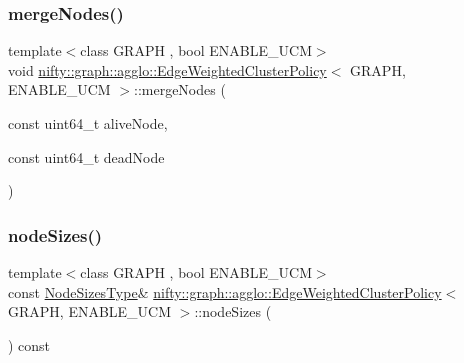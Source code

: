 \mbox{\label{classnifty_1_1graph_1_1agglo_1_1EdgeWeightedClusterPolicy_ab6176f00d96818257fdffdb7a363c5e1}} 
\subsubsection{\texorpdfstring{merge\+Nodes()}{mergeNodes()}}
{\footnotesize\ttfamily template$<$class G\+R\+A\+PH , bool E\+N\+A\+B\+L\+E\+\_\+\+U\+CM$>$ \\
void \hyperlink{classnifty_1_1graph_1_1agglo_1_1EdgeWeightedClusterPolicy}{nifty\+::graph\+::agglo\+::\+Edge\+Weighted\+Cluster\+Policy}$<$ G\+R\+A\+PH, E\+N\+A\+B\+L\+E\+\_\+\+U\+CM $>$\+::merge\+Nodes (\begin{DoxyParamCaption}\item[{const uint64\+\_\+t}]{alive\+Node,  }\item[{const uint64\+\_\+t}]{dead\+Node }\end{DoxyParamCaption})\hspace{0.3cm}{\ttfamily [inline]}}

\mbox{\label{classnifty_1_1graph_1_1agglo_1_1EdgeWeightedClusterPolicy_acb9c315d3881c21c55ac4d526baccdd9}} 
\subsubsection{\texorpdfstring{node\+Sizes()}{nodeSizes()}}
{\footnotesize\ttfamily template$<$class G\+R\+A\+PH , bool E\+N\+A\+B\+L\+E\+\_\+\+U\+CM$>$ \\
const \hyperlink{classnifty_1_1graph_1_1agglo_1_1EdgeWeightedClusterPolicy_a44ba54059efcb57c8c8091016fb9ee99}{Node\+Sizes\+Type}\& \hyperlink{classnifty_1_1graph_1_1agglo_1_1EdgeWeightedClusterPolicy}{nifty\+::graph\+::agglo\+::\+Edge\+Weighted\+Cluster\+Policy}$<$ G\+R\+A\+PH, E\+N\+A\+B\+L\+E\+\_\+\+U\+CM $>$\+::node\+Sizes (\begin{DoxyParamCaption}{ }\end{DoxyParamCaption}) const\hspace{0.3cm}{\ttfamily [inline]}}



